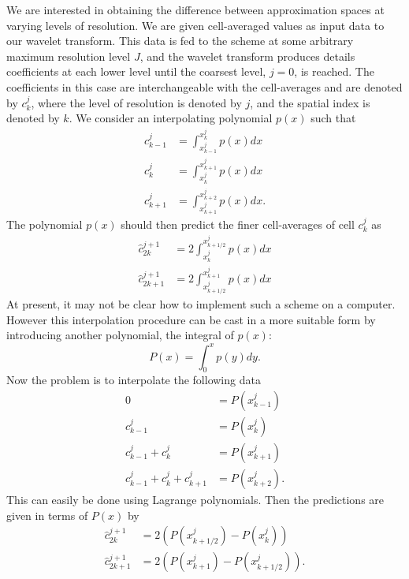 \documentclass[12pt,letterpaper]{article}
\begin{document}
    We are interested in obtaining the difference between approximation spaces at varying levels of resolution. We 
    are given cell-averaged values as input data to our wavelet transform. This data is fed to the scheme at some arbitrary maximum
    resolution level $J$, and the wavelet transform produces details coefficients at each lower level until the coarsest level,
    $j=0$, is reached. The coefficients in this case are interchangeable with the cell-averages and are denoted by $c^{j}_{k}$,
    where the level of resolution is denoted by $j$, and the spatial index is denoted by $k$. We consider an interpolating
    polynomial $p(x)$ such that 
    \begin{align}
        c^{j}_{k-1} &= \int_{x^{j}_{k-1}}^{x^{j}_{k}} p(x) dx \\
        c^{j}_{k} &= \int_{x^{j}_{k}}^{x^{j}_{k+1}} p(x) dx \\
        c^{j}_{k+1} &= \int_{x^{j}_{k+1}}^{x^{j}_{k+2}} p(x) dx.
    \end{align}
    The polynomial $p(x)$ should then predict the finer cell-averages of cell $c^{j}_{k}$ as
    \begin{align}
        \hat{c}^{j+1}_{2k} &= 2 \int_{x^{j}_{k}}^{x^{j}_{k+1/2}} p(x) dx \\
        \hat{c}^{j+1}_{2k+1} &= 2 \int_{x^{j}_{k+1/2}}^{x^{j}_{k+1}} p(x) dx
    \end{align}
    At present, it may not be clear how to implement such a scheme on a computer. However this interpolation procedure
    can be cast in a more suitable form by introducing another polynomial, the integral of $p(x)$:
    \begin{equation}
        P(x) = \int_{0}^{x} p(y) dy.
    \end{equation}
    Now the problem is to interpolate the following data
    \begin{align}
        0 &= P(x^{j}_{k-1}) \\
        c^{j}_{k-1} &= P(x^{j}_{k}) \\
        c^{j}_{k-1} + c^{j}_{k} &= P(x^{j}_{k+1}) \\
        c^{j}_{k-1} + c^{j}_{k} + c^{j}_{k+1} &= P(x^{j}_{k+2}).
    \end{align}
    This can easily be done using Lagrange polynomials. Then the predictions are given in terms of $P(x)$ by
    \begin{align}
        \hat{c}^{j+1}_{2k} &= 2 \left( P(x^{j}_{k+1/2}) - P(x^{j}_{k}) \right) \\
        \hat{c}^{j+1}_{2k+1} &= 2 \left( P(x^{j}_{k+1}) - P(x^{j}_{k+1/2}) \right).
    \end{align}
\end{document}
